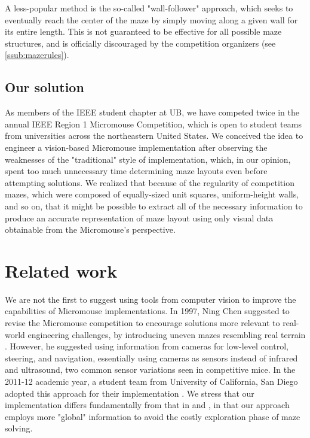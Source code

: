 \documentclass[10pt,twocolumn,letterpaper]{article}
\begin{document}
A less-popular method is the so-called "wall-follower" approach, which seeks to eventually reach the center of the maze
by simply moving along a given wall for its entire length.  This is not guaranteed to be effective for all possible maze
structures, and is officially discouraged by the competition organizers (see \textsection\ref{ssub:mazerules}).

\subsection{Our solution}
\label{sub:oursolution}

As members of the IEEE student chapter at UB, we have competed twice in the annual IEEE Region 1 Micromouse Competition,
which is open to student teams from universities across the northeastern United States.  We conceived the idea to
engineer a vision-based Micromouse implementation after observing the weaknesses of the "traditional" style of
implementation, which, in our opinion, spent too much unnecessary time determining maze layouts even before attempting
solutions.  We realized that because of the regularity of competition mazes, which were composed of equally-sized unit
squares, uniform-height walls, and so on, that it might be possible to extract all of the necessary information to
produce an accurate representation of maze layout using only visual data obtainable from the
Micromouse's perspective.

\section{Related work}
\label{sec:relatedwork}

We are not the first to suggest using tools from computer vision to improve the capabilities of Micromouse
implementations.  In 1997, Ning Chen suggested to revise the Micromouse competition to encourage solutions more relevant
to real-world engineering challenges, by introducing uneven mazes resembling real terrain \cite{Chen1997}.  However, he
suggested using information from cameras for low-level control, steering, and navigation, essentially using cameras as
sensors instead of infrared and ultrasound, two common sensor variations seen in competitive mice.  In the 2011-12
academic year, a student team from University of California, San Diego adopted this approach for their implementation
\cite{ucsd}.  We stress that our implementation differs fundamentally from that in \cite{Chen1997} and \cite{ucsd}, in
that our approach employs more "global" information to avoid the costly exploration phase of maze solving.
\end{document}
